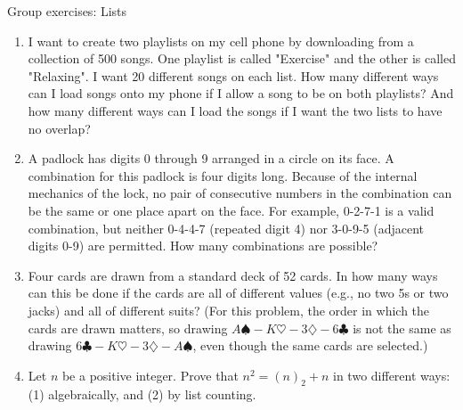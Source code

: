 \documentclass[10pt]{beamer}
\begin{document}
\begin{frame}{Group exercises: Lists}
\footnotesize 

    \begin{minipage}{0.85\textwidth} %
	\begin{enumerate}
	\item I want to create two playlists on my cell phone by downloading from a collection of 500 songs. One playlist is called "Exercise" and the other is called "Relaxing".  I want 20 different songs on each list.  How many different ways can I load songs onto my phone if I allow a song to be on both playlists?  And how many different ways can I load the songs if I want the two lists to have no overlap? 
	\item A padlock has digits 0 through 9 arranged in a circle on its face. A combination for this padlock is four digits long. Because of the internal mechanics of the lock, no pair of consecutive numbers in the combination can be the same or one place apart on the face.  For example, 0-2-7-1 is a valid combination, but neither 0-4-4-7 (repeated digit 4) nor 3-0-9-5 (adjacent digits 0-9) are permitted.  How many combinations are possible?
	\item Four cards are drawn from a standard deck of 52 cards. In how many ways can this be done if the cards are all of different values (e.g., no two 5s or two jacks) and all of different suits?  (For this problem, the order in which the cards are drawn matters, so drawing $A \spadesuit-K \heartsuit - 3 \diamondsuit - 6 \clubsuit$ is not the same as drawing $6 \clubsuit -K \heartsuit - 3 \diamondsuit - A \spadesuit$, even though the same cards are selected.) 
	\item Let $n$ be a positive integer. Prove that $n^2 = (n)_2 + n$ in two different ways: (1) algebraically, and (2) by list counting.
	\end{enumerate}
    \end{minipage}%
    \hfill
    \begin{minipage}{0.15\textwidth} %
        \centering

\end{minipage}
\end{frame}
\end{document}
